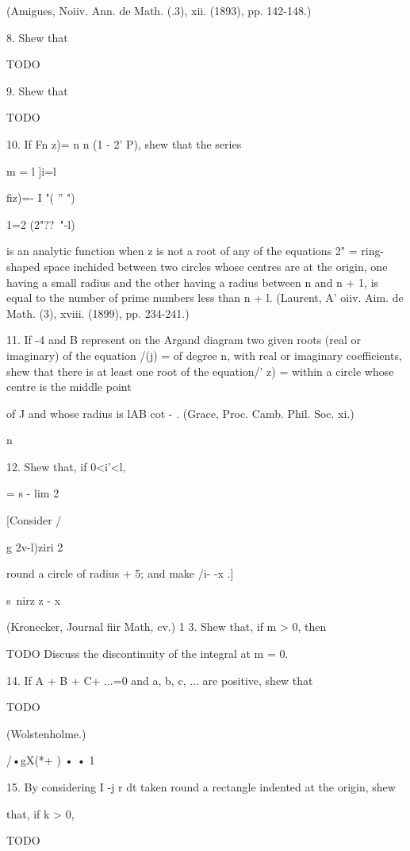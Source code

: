 (Amigues, Noiiv. Ann. de Math. (.3), xii. (1893), pp. 142-148.)

8. Shew that

TODO

9. Shew that

TODO

%
%

10. If Fn z)= n n (1 - 2' P), shew that the series

m = l ]i=l

fiz)=- I "( '' ")

1=2 (2"??~"-l)%

is an analytic function when z is not a root of any of the equations
2" = %
ring-shaped space inchided between two circles whose centres are at
the origin, one having a small radius and the other having a radius
between n and n + 1, is equal to the number of prime numbers less than
n + l. (Laurent, A' oiiv. Aim. de Math. (3), xviii. (1899), pp.
234-241.)

11. If -4 and B represent on the Argand diagram two given roots (real
or imaginary) of the equation /(j) = of degree n, with real or
imaginary coefficients, shew that there is at least one root of the
equation/' z) = within a circle whose centre is the middle point

of J and whose radius is lAB cot - . (Grace, Proc. Camb. Phil. Soc.
xi.)

n

12. Shew that, if 0<i'<l,

= s - lim 2

[Consider /

g 2v-l)ziri 2

round a circle of radius + 5; and make /i- -x .]

s\ nirz z - x

(Kronecker, Journal fiir Math, cv.) 1 3. Shew that, if m > 0, then

TODO
Discuss the discontinuity of the integral at m = 0.

14. If A + B + C+ ...=0 and a, b, c, ... are positive, shew that

TODO

(Wolstenholme.)

/•gX(*+ ) • • 1

15. By considering I -j r dt taken round a rectangle indented at the
origin, shew

that, if k > 0,

TODO

